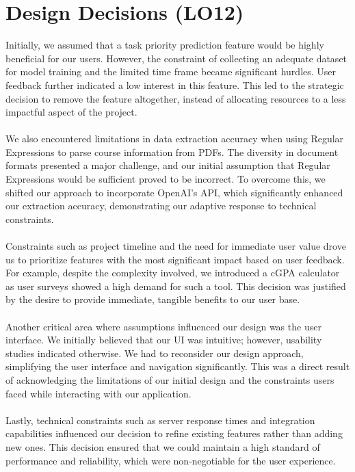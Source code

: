 \documentclass{article}
\begin{document}
\section{Design Decisions (LO12)}

Initially, we assumed that a task priority prediction feature would be highly beneficial for our users. However, the constraint of collecting an adequate dataset for model training and the limited time frame became significant hurdles. User feedback further indicated a low interest in this feature. This led to the strategic decision to remove the feature altogether, instead of allocating resources to a less impactful aspect of the project.\\
\\
We also encountered limitations in data extraction accuracy when using Regular Expressions to parse course information from PDFs. The diversity in document formats presented a major challenge, and our initial assumption that Regular Expressions would be sufficient proved to be incorrect. To overcome this, we shifted our approach to incorporate OpenAI's API, which significantly enhanced our extraction accuracy, demonstrating our adaptive response to technical constraints.\\
\\
Constraints such as project timeline and the need for immediate user value drove us to prioritize features with the most significant impact based on user feedback. For example, despite the complexity involved, we introduced a cGPA calculator as user surveys showed a high demand for such a tool. This decision was justified by the desire to provide immediate, tangible benefits to our user base.\\
\\
Another critical area where assumptions influenced our design was the user interface. We initially believed that our UI was intuitive; however, usability studies indicated otherwise. We had to reconsider our design approach, simplifying the user interface and navigation significantly. This was a direct result of acknowledging the limitations of our initial design and the constraints users faced while interacting with our application.\\
\\
Lastly, technical constraints such as server response times and integration capabilities influenced our decision to refine existing features rather than adding new ones. This decision ensured that we could maintain a high standard of performance and reliability, which were non-negotiable for the user experience.
\end{document}
